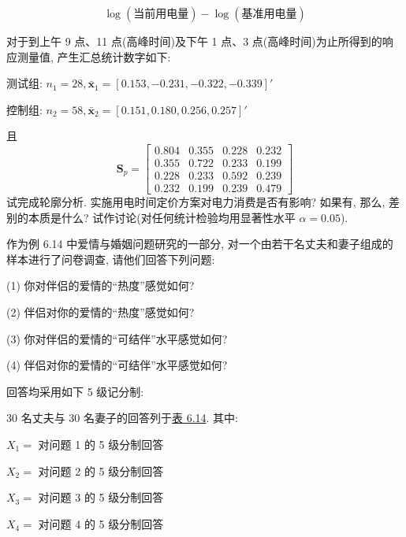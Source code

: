 
\[
\log(\text{当前用电量})-\log(\text{基准用电量})
\]

对于到上午 9 点、11 点(高峰时间)及下午 1 点、3 点(高峰时间)为止所得到的响应测量值, 产生汇总统计数字如下:

测试组: $n_1=28, \bar{\mathbf{x}}_1=[0.153,-0.231,-0.322,-0.339]'$

控制组: $n_2=58, \bar{\mathbf{x}}_2=[0.151,0.180,0.256,0.257]'$

且
\[
\mathbf{S}_p=\begin{bmatrix}0.804&0.355&0.228&0.232\\0.355&0.722&0.233&0.199\\0.228&0.233&0.592&0.239\\0.232&0.199&0.239&0.479\end{bmatrix}
\]
试完成轮廓分析. 实施用电时间定价方案对电力消费是否有影响? 如果有, 那么, 差别的本质是什么? 试作讨论(对任何统计检验均用显著性水平 $\alpha=0.05$).

\quad 作为例 6.14 中爱情与婚姻问题研究的一部分, 对一个由若干名丈夫和妻子组成的样本进行了问卷调查, 请他们回答下列问题:

\noindent (1) 你对伴侣的爱情的“热度”感觉如何?

\noindent (2) 伴侣对你的爱情的“热度”感觉如何?

\noindent (3) 你对伴侣的爱情的“可结伴”水平感觉如何?

\noindent (4) 伴侣对你的爱情的“可结伴”水平感觉如何?

\noindent 回答均采用如下 5 级记分制:

\begin{center}
\end{center}

30 名丈夫与 30 名妻子的回答列于\hyperref[tab:6.14]{表 6.14}. 其中:

\noindent $X_1=$ 对问题 1 的 5 级分制回答

\noindent $X_2=$ 对问题 2 的 5 级分制回答

\noindent $X_3=$ 对问题 3 的 5 级分制回答

\noindent $X_4=$ 对问题 4 的 5 级分制回答

